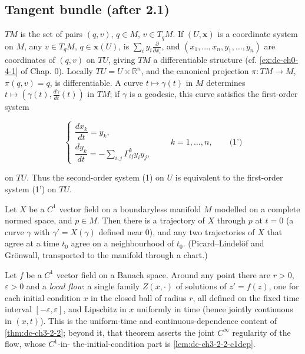 \subsection{Tangent bundle (after 2.1)}
$TM$ is the set of pairs $(q,v)$, $q\in M$, $v\in T_qM$. If $(U,\mathbf{x})$ is a
coordinate system on $M$, any $v\in T_qM$, $q\in\mathbf{x}(U)$, is
$\sum_i y_i\frac{\partial}{\partial x_i}$, and $(x_1,\dots,x_n,y_1,\dots,y_n)$ are
coordinates of $(q,v)$ on $TU$, giving $TM$ a differentiable structure (cf.
\cref{ex:dc-ch0-4-1} of Chap. 0). Locally $TU=U\times\mathbb{R}^n$, and the canonical
projection $\pi:TM\to M$, $\pi(q,v)=q$, is differentiable. A curve $t\mapsto\gamma(t)$
in $M$ determines $t\mapsto(\gamma(t),\frac{d\gamma}{dt}(t))$ in $TM$; if $\gamma$
is a geodesic, this curve satisfies the first-order system

$$
\begin{cases}\dfrac{dx_k}{dt}=y_k,\\[4pt]\dfrac{dy_k}{dt}=-\sum_{i,j}\Gamma_{ij}^k y_i y_j,\end{cases}\qquad k=1,\dots,n,\qquad\text{(1')}
$$

on $TU$. Thus the second-order system (1) on $U$ is equivalent to the first-order
system (1') on $TU$.

\begin{lemma}
  \label{lem:dc-ch3-2-2-pointwise}
  \mathlibok
  Let $X$ be a $C^1$ vector field on a boundaryless manifold $M$ modelled on a
  complete normed space, and $p\in M$. Then there is a trajectory of $X$ through
  $p$ at $t=0$ (a curve $\gamma$ with $\gamma'=X(\gamma)$ defined near $0$), and
  any two trajectories of $X$ that agree at a time $t_0$ agree on a
  neighbourhood of $t_0$. (Picard--Lindel\"of and Gr\"onwall, transported to the
  manifold through a chart.)
\end{lemma}

\begin{lemma}
  \label{lem:dc-ch3-2-2-flow}
  \mathlibok
  Let $f$ be a $C^1$ vector field on a Banach space. Around any point there are
  $r > 0$, $\varepsilon > 0$ and a \emph{local flow}: a single family
  $Z(x, \cdot)$ of solutions of $z' = f(z)$, one for each initial condition $x$
  in the closed ball of radius $r$, all defined on the fixed time interval
  $[-\varepsilon, \varepsilon]$, and Lipschitz in $x$ uniformly in time (hence
  jointly continuous in $(x, t)$). This is the uniform-time and
  continuous-dependence content of \cref{thm:dc-ch3-2-2}; beyond it, that
  theorem asserts the joint $C^\infty$ regularity of the flow, whose $C^1$-in-%
  the-initial-condition part is \cref{lem:dc-ch3-2-2-c1dep}.
\end{lemma}

